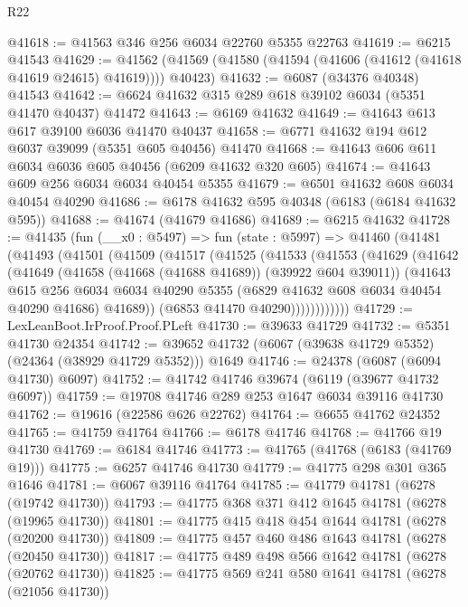 \begin{lexlean}{R22}
\begin{coremodule}
@41618 := @41563 @346 @256 @6034 @22760 @5355 @22763
@41619 := @6215 @41543
@41629 := @41562 (@41569 (@41580 (@41594 (@41606 (@41612 (@41618 @41619 @24615) @41619)))) @40423)
@41632 := @6087 (@34376 @40348) @41543
@41642 := @6624 @41632 @315 @289 @618 @39102 @6034 (@5351 @41470 @40437) @41472
@41643 := @6169 @41632
@41649 := @41643 @613 @617 @39100 @6036 @41470 @40437
@41658 := @6771 @41632 @194 @612 @6037 @39099 (@5351 @605 @40456) @41470
@41668 := @41643 @606 @611 @6034 @6036 @605 @40456 (@6209 @41632 @320 @605)
@41674 := @41643 @609 @256 @6034 @6034 @40454 @5355
@41679 := @6501 @41632 @608 @6034 @40454 @40290
@41686 := @6178 @41632 @595 @40348 (@6183 (@6184 @41632 @595))
@41688 := @41674 (@41679 @41686)
@41689 := @6215 @41632
@41728 := @41435
    (fun (__x0 : @5497) =>
    fun (state : @5997) =>
    @41460
      (@41481
        (@41493
          (@41501
            (@41509
              (@41517
                (@41525
                  (@41533
                    (@41553
                      (@41629
                        (@41642
                          (@41649
                            (@41658 (@41668 (@41688 @41689)) (@39922 @604 @39011))
                            (@41643
                              @615
                              @256
                              @6034
                              @6034
                              @40290
                              @5355
                              (@6829 @41632 @608 @6034 @40454 @40290 @41686)
                              @41689))
                          (@6853 @41470 @40290))))))))))))
@41729 := LexLeanBoot.IrProof.Proof.PLeft
@41730 := @39633 @41729
@41732 := @5351 @41730 @24354
@41742 := @39652 @41732 (@6067 (@39638 @41729 @5352) (@24364 (@38929 @41729 @5352))) @1649
@41746 := @24378 (@6087 (@6094 @41730) @6097)
@41752 := @41742 @41746 @39674 (@6119 (@39677 @41732 @6097))
@41759 := @19708 @41746 @289 @253 @1647 @6034 @39116 @41730
@41762 := @19616 (@22586 @626 @22762)
@41764 := @6655 @41762 @24352
@41765 := @41759 @41764
@41766 := @6178 @41746
@41768 := @41766 @19 @41730
@41769 := @6184 @41746
@41773 := @41765 (@41768 (@6183 (@41769 @19)))
@41775 := @6257 @41746 @41730
@41779 := @41775 @298 @301 @365 @1646
@41781 := @6067 @39116 @41764
@41785 := @41779 @41781 (@6278 (@19742 @41730))
@41793 := @41775 @368 @371 @412 @1645 @41781 (@6278 (@19965 @41730))
@41801 := @41775 @415 @418 @454 @1644 @41781 (@6278 (@20200 @41730))
@41809 := @41775 @457 @460 @486 @1643 @41781 (@6278 (@20450 @41730))
@41817 := @41775 @489 @498 @566 @1642 @41781 (@6278 (@20762 @41730))
@41825 := @41775 @569 @241 @580 @1641 @41781 (@6278 (@21056 @41730))

\end{coremodule}
\end{lexlean}
